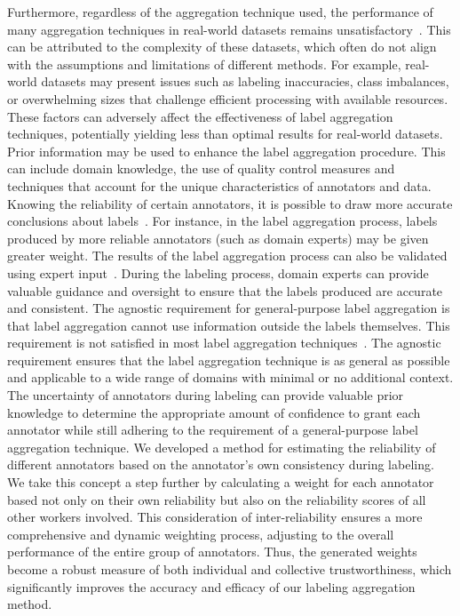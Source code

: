 Furthermore, regardless of the aggregation technique used, the performance of many aggregation techniques in real-world datasets remains unsatisfactory~\cite{liu_Exploiting_2021}. This can be attributed to the complexity of these datasets, which often do not align with the assumptions and limitations of different methods. For example, real-world datasets may present issues such as labeling inaccuracies, class imbalances, or overwhelming sizes that challenge efficient processing with available resources. These factors can adversely affect the effectiveness of label aggregation techniques, potentially yielding less than optimal results for real-world datasets.
Prior information may be used to enhance the label aggregation procedure.
This can include domain knowledge, the use of quality control measures and techniques that account for the unique characteristics of annotators and data. Knowing the reliability of certain annotators, it is possible to draw more accurate conclusions about labels~\cite{li_Crowdsourced_2017}. For instance, in the label aggregation process, labels produced by more reliable annotators (such as domain experts) may be given greater weight. The results of the label aggregation process can also be validated using expert input~\cite{liu_Improving_2017}. During the labeling process, domain experts can provide valuable guidance and oversight to ensure that the labels produced are accurate and consistent.
The agnostic requirement for general-purpose label aggregation is that label aggregation cannot use information outside the labels themselves. This requirement is not satisfied in most label aggregation techniques~\cite{zhang_Crowdsourced_2019}. The agnostic requirement ensures that the label aggregation technique is as general as possible and applicable to a wide range of domains with minimal or no additional context.
The uncertainty of annotators during labeling can provide valuable prior knowledge to determine the appropriate amount of confidence to grant each annotator while still adhering to the requirement of a general-purpose label aggregation technique. We developed a method for estimating the reliability of different annotators based on the annotator's own consistency during labeling. We take this concept a step further by calculating a weight for each annotator based not only on their own reliability but also on the reliability scores of all other workers involved. This consideration of inter-reliability ensures a more comprehensive and dynamic weighting process, adjusting to the overall performance of the entire group of annotators. Thus, the generated weights become a robust measure of both individual and collective trustworthiness, which significantly improves the accuracy and efficacy of our labeling aggregation method.

